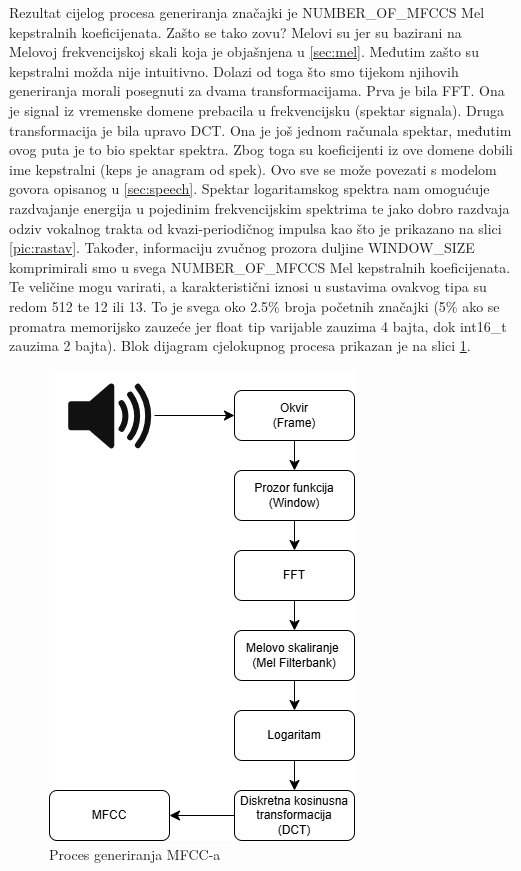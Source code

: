 Rezultat cijelog procesa generiranja značajki je NUMBER\_OF\_MFCCS Mel kepstralnih
koeficijenata. Zašto se tako zovu? Melovi su jer su bazirani na Melovoj frekvencijskoj
skali koja je objašnjena u \ref{sec:mel}. Međutim zašto su kepstralni možda nije intuitivno.
Dolazi od toga što smo tijekom njihovih generiranja morali posegnuti za dvama transformacijama.
Prva je bila FFT. Ona je signal iz vremenske domene prebacila u frekvencijsku (spektar
signala). Druga transformacija je bila upravo DCT. Ona je još jednom računala spektar, međutim
ovog puta je to bio spektar spektra. Zbog toga su koeficijenti iz ove domene dobili ime
kepstralni (keps je anagram od spek). Ovo sve se može povezati s modelom govora opisanog
u \ref{sec:speech}. Spektar logaritamskog spektra nam omogućuje razdvajanje energija u pojedinim 
frekvencijskim spektrima te jako dobro razdvaja odziv vokalnog trakta od kvazi-periodičnog
impulsa kao što je prikazano na slici \ref{pic:rastav}. Također, informaciju zvučnog
prozora duljine WINDOW\_SIZE komprimirali smo
u svega NUMBER\_OF\_MFCCS Mel kepstralnih koeficijenata. Te veličine mogu varirati, a
karakteristični iznosi u sustavima ovakvog tipa su redom 512 te 12 ili 13. To je svega
oko 2.5\% 
broja početnih značajki (5\% ako se promatra memorijsko zauzeće jer float tip varijable
zauzima 4 bajta, dok int16\_t zauzima 2 bajta). Blok dijagram cjelokupnog procesa prikazan
je na slici \ref{pic:generation}.

\begin{figure}[htb]
    \centering
    \includegraphics[width=0.4\linewidth]{Chapters/struktura_sustava/generiranje_znacajki/generation.png} 
    \caption{Proces generiranja MFCC-a \cite{flowchart}}
    \label{pic:generation}
\end{figure}

